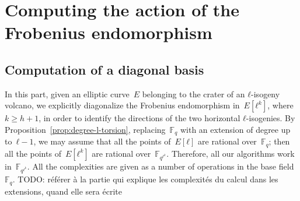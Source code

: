 \documentclass{lms}
\newcommand{\todo}[1]{{\color{red}TODO: #1}}
\begin{document}


\section{Computing the action of the Frobenius endomorphism}
\label{sec:acti-frob-endm}

\subsection{Computation of a diagonal basis}
\label{ss:diagonal}

In this part, given an elliptic curve~$E$ belonging to the crater
of an $ℓ$-isogeny volcano, we explicitly diagonalize the Frobenius endomorphism
in~$E[ℓ^k]$, where $k ≥ h+1$,
in order to identify the directions of the two horizontal $ℓ$-isogenies.
By Proposition~\ref{prop:degree-l-torsion},
replacing~$\mathbb F_q$ with an extension of degree up to~$ℓ - 1$,
we may assume that all the points of~$E[ℓ]$ are rational over~$\mathbb F_q$;
then all the points of~$E[ℓ^k]$ are rational over~$\mathbb F_{q^{ℓ^k}}$.
Therefore, all our algorithms work in~$\mathbb F_{q^{ℓ^k}}$.
All the complexities are given as a number of
operations in the base field~$\mathbb F_q$.
\todo{référer à la partie qui explique les complexités du calcul dans les
extensions, quand elle sera écrite}



% 
\end{document}
